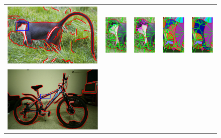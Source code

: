 \begin{figure}[!ht]
\centering
  \begin{tabular}{ccccc}
    \includegraphics[height=0.15\linewidth]{figs/n02484322_9968_l1.pdf} & 
    \includegraphics[height=0.15\linewidth]{figs/n02484322_9968_l1_before_shocks.pdf} &
    \includegraphics[height=0.15\linewidth]{figs/n02484322_9968_l1_after_shocks.pdf} &
    \includegraphics[height=0.15\linewidth]{figs/n02484322_9968_l1_before_frags.pdf} &
    \includegraphics[height=0.15\linewidth]{figs/n02484322_9968_l1_after_frags.pdf} \\
    \includegraphics[width=0.15\linewidth]{figs/002227_loop_l1.pdf} &

\end{tabular}
\end{figure}
